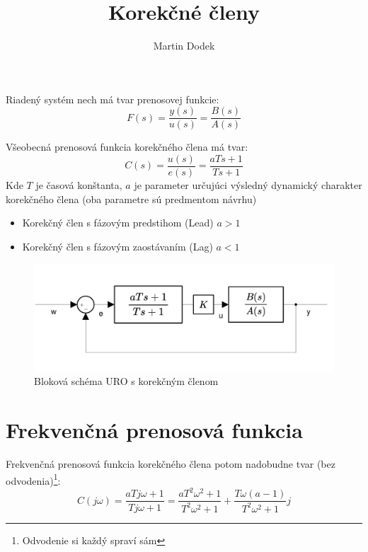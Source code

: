 \documentclass[a4paper,10pt]{article}
\begin{document}
\title{Korekčné členy}

\author{Martin Dodek}
\pagestyle{plain}
\maketitle


Riadený systém nech má tvar prenosovej funkcie:
\begin{equation}
\label{eq:riadený systém}
F(s)=\frac{y(s)}{u(s)}=\frac{B(s)}{A(s)}
\end{equation}

Všeobecná prenosová funkcia korekčného člena má tvar:
\begin{equation}
 \label{eq:prenosová funkcia korekčného člena}
 C(s)=\frac{u(s)}{e(s)}=\frac{aTs+1}{Ts+1}
\end{equation}
Kde $T$ je časová konštanta, $a$ je parameter určujúci výsledný dynamický charakter korekčného člena (oba parametre sú predmentom návrhu)

\begin{itemize}
	\item Korekčný člen s fázovým predstihom (Lead) $a>1$
	\item Korekčný člen s fázovým zaostávaním (Lag) $a<1$
\end{itemize}


\begin{figure}[ht]
\centering
\includegraphics[scale=0.5]{blokova_schema}
\caption{Bloková schéma URO s korekčným členom}
\end{figure}



\section{Frekvenčná prenosová funkcia}
Frekvenčná prenosová funkcia korekčného člena potom nadobudne tvar (bez odvodenia)\footnote{Odvodenie si každý spraví sám}:
\begin{equation}
\label{eq:frekvenčná prenosová funkcia korekčného člena}
 C(j\omega)=\frac{aTj\omega+1}{Tj\omega+1}=\frac{aT^2\omega^2+1}{T^2\omega^2+1}+\frac{T\omega(a-1)}{T^2\omega^2+1}j
\end{equation}
\end{document}
